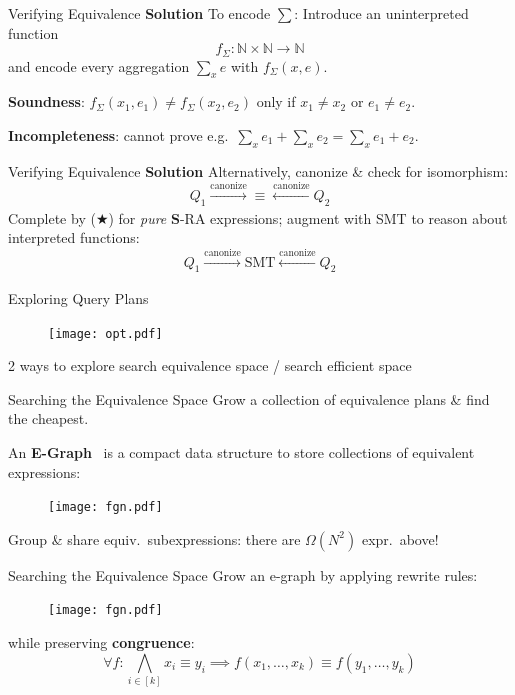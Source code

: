 \documentclass{beamer}
\newcommand{\N}{\mathbb N} %
\newcommand{\SR}{\mathbf S} %
\begin{document}
  \begin{frame}{Verifying Equivalence}
    \textbf{Solution} To encode $\sum$: Introduce an uninterpreted function
    \[f_{\Sigma}:\N\times \N \rightarrow \N\] 
    and encode every aggregation $\sum_x e$ with $f_{\Sigma}(x, e)$. \pause

    \textbf{Soundness}: $f_{\Sigma}(x_1, e_1) \neq f_{\Sigma}(x_2, e_2)$ only
    if $x_1 \neq x_2$ or $e_1 \neq e_2$.\pause

    \textbf{Incompleteness}: cannot prove 
    e.g.~$\sum_x e_1 + \sum_x e_2 = \sum_x e_1 + e_2$.
  \end{frame}

  \begin{frame}{Verifying Equivalence}
    \textbf{Solution} Alternatively, canonize \& check for isomorphism:
    \[Q_1 \xrightarrow[]{\text{canonize}} \equiv \xleftarrow[]{\text{canonize}} Q_2\]
    Complete by ($\bigstar$) for {\em pure} $\SR$-RA expressions; \pause
    augment with SMT to reason about interpreted functions:
    \[Q_1 \xrightarrow[]{\text{canonize}} \text{SMT} \xleftarrow[]{\text{canonize}} Q_2\]
  \end{frame}

  \begin{frame}{Exploring Query Plans}
    \begin{figure}
      \texttt{[image: opt.pdf]}
    \end{figure}
    2 ways to explore search equivalence space / search efficient space
  \end{frame}

  \begin{frame}{Searching the Equivalence Space}
    Grow a collection of equivalence plans \& find the cheapest. \pause

    An \textbf{E-Graph}~\cite{eqsat} is a compact data structure to store collections 
    of equivalent expressions:
    \begin{figure}
      \texttt{[image: fgn.pdf]}
    \end{figure}
    Group \& share equiv.~subexpressions: there are $\Omega(N^2)$ expr.~above!
  \end{frame}

  \begin{frame}{Searching the Equivalence Space}
    Grow an e-graph by applying rewrite rules:
    \begin{figure}
      \texttt{[image: fgn.pdf]}
    \end{figure}
    while preserving \textbf{congruence}: 
    \[\forall f : \bigwedge_{i \in [k]} x_i \equiv y_i \implies f(x_1, \ldots, x_k ) \equiv f(y_1, \ldots, y_k)\]
  \end{frame}
\end{document}
